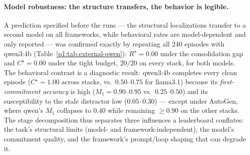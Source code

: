 \documentclass{article}
\begin{document}
\paragraph{Model robustness: the structure transfers, the behavior is
legible.} A prediction specified before the runs --- the structural
localizations transfer to a second model on all frameworks, while
behavioral rates are model-dependent and only reported --- was
confirmed exactly by repeating all 240 episodes with qwen3:4b
(Table~\ref{p1:tab:external-qwen}): $R^\star{=}0.00$ under the
consolidation gap and $C^\star{=}0.00$ under the tight budget, $20/20$
on every stack, for both models. The behavioral contrast is a
diagnostic result: qwen3:4b completes every clean episode
($C^\star{=}1.00$ across stacks, vs.\ $0.50$--$0.75$ for llama3.1)
because its \emph{first-commitment accuracy} is high
($M_1{=}0.90$--$0.95$ vs.\ $0.25$--$0.50$) and its susceptibility to
the stale distractor low ($0.05$--$0.30$) --- except under AutoGen,
where qwen's $M_1$ collapses to $0.40$ while remaining $\ge 0.90$ on
the other stacks. The stage decomposition thus separates three
influences a leaderboard conflates: the task's structural limits
(model- and framework-independent), the model's commitment quality,
and the framework's prompt/loop shaping that can degrade it.
\end{document}

